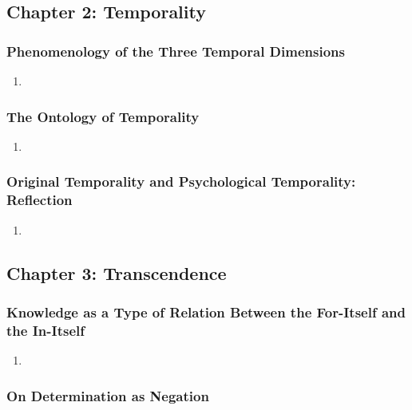 \subsection{Chapter 2: Temporality}

\subsubsection{Phenomenology of the Three Temporal Dimensions}

\begin{enumerate}
  \item
\end{enumerate}

\subsubsection{The Ontology of Temporality}

\begin{enumerate}
  \item
\end{enumerate}

\subsubsection{Original Temporality and Psychological Temporality: Reflection}

\begin{enumerate}
  \item
\end{enumerate}

\subsection{Chapter 3: Transcendence}

\subsubsection{Knowledge as a Type of Relation Between the For-Itself and the In-Itself}

\begin{enumerate}
  \item
\end{enumerate}

\subsubsection{On Determination as Negation}

